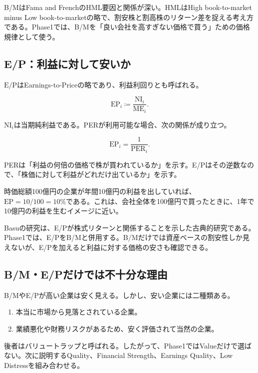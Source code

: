 \documentclass[11pt,a4paper]{article}
\newcommand{\ME}{\mathrm{ME}}
\newcommand{\NI}{\mathrm{NI}}
\newcommand{\EPratio}{\mathrm{E/P}}
\begin{document}
B/MはFama and FrenchのHML要因と関係が深い。HMLはHigh book-to-market minus Low book-to-marketの略で、割安株と割高株のリターン差を捉える考え方である。Phase1では、B/Mを「良い会社を高すぎない価格で買う」ための価格規律として使う。

\subsection{E/P：利益に対して安いか}

$\EPratio$はEarnings-to-Priceの略であり、利益利回りとも呼ばれる。

\begin{equation}
\mathrm{EP}_i \coloneqq \frac{\NI_i}{\ME_i}.
\label{eq:ep}
\end{equation}

$\NI_i$は当期純利益である。PERが利用可能な場合、次の関係が成り立つ。

\begin{equation}
\mathrm{EP}_i = \frac{1}{\mathrm{PER}_i}.
\label{eq:ep-per}
\end{equation}

PERは「利益の何倍の価格で株が買われているか」を示す。E/Pはその逆数なので、「株価に対して利益がどれだけ出ているか」を示す。

\begin{defbox}[直感]
時価総額100億円の企業が年間10億円の利益を出していれば、$\mathrm{EP}=10/100=10\%$である。これは、会社全体を100億円で買ったときに、1年で10億円の利益を生むイメージに近い。
\end{defbox}

Basuの研究は、E/Pが株式リターンと関係することを示した古典的研究である。Phase1では、E/PをB/Mと併用する。B/Mだけでは資産ベースの割安性しか見えないが、E/Pを加えると利益に対する価格の安さも確認できる。

\subsection{B/M・E/Pだけでは不十分な理由}

B/MやE/Pが高い企業は安く見える。しかし、安い企業には二種類ある。

\begin{enumerate}[leftmargin=2em]
\item 本当に市場から見落とされている企業。
\item 業績悪化や財務リスクがあるため、安く評価されて当然の企業。
\end{enumerate}

後者はバリュートラップと呼ばれる。したがって、Phase1ではValueだけで選ばない。次に説明するQuality、Financial Strength、Earnings Quality、Low Distressを組み合わせる。
\end{document}
